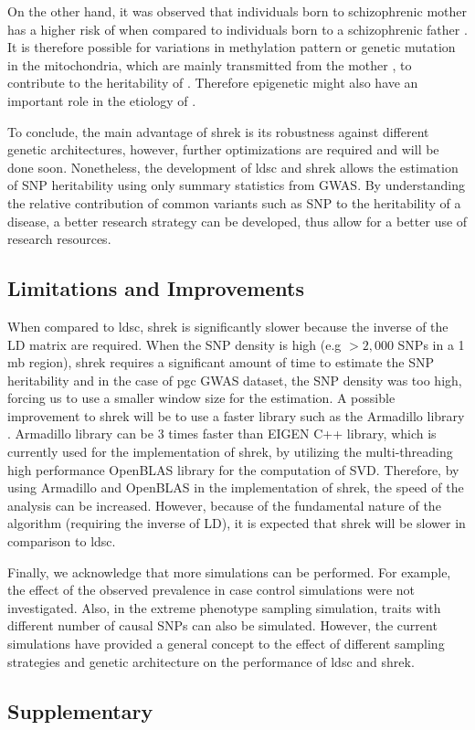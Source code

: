 	On the other hand, it was observed that individuals born to schizophrenic mother has a higher risk of  when compared to individuals born to a schizophrenic father \citep{Riley2006}. 
	It is therefore possible for variations in methylation pattern or genetic mutation in the mitochondria, which are mainly transmitted from the mother \citep{Sutovsky1999}, to contribute to the heritability of .
	Therefore epigenetic might also have an important role in the etiology of .

	To conclude, the main advantage of \gls{shrek} is its robustness against different genetic architectures, however, further optimizations are required and will be done soon. 
	Nonetheless, the development of \gls{ldsc} and \gls{shrek} allows the estimation of \gls{SNP} heritability using only summary statistics from \gls{GWAS}.
	By understanding the relative contribution of common variants such as \gls{SNP} to the heritability of a disease, a better research strategy can be developed, thus allow for a better use of research resources.
	
	\subsection{Limitations and Improvements}
	When compared to \gls{ldsc}, \gls{shrek} is significantly slower because the inverse of the \gls{LD} matrix are required.
	When the \gls{SNP} density is high (e.g $>2,000$ \glspl{SNP} in a 1 \gls{mb} region), \gls{shrek} requires a significant amount of time to estimate the \gls{SNP} heritability and in the case of \gls{pgc}  \gls{GWAS} dataset, the \gls{SNP} density was too high, forcing us to use a smaller window size for the estimation.
	A possible improvement to \gls{shrek} will be to use a faster library such as the Armadillo library \citep{Sanderson2010}.
	Armadillo library can be 3 times faster than EIGEN C++ library, which is currently used for the implementation of \gls{shrek}, by utilizing the multi-threading high performance OpenBLAS library for the computation of \gls{SVD}.
	Therefore, by using Armadillo and OpenBLAS in the implementation of \gls{shrek}, the speed of the analysis can be increased.
	However, because of the fundamental nature of the algorithm (requiring the inverse of \gls{LD}), it is expected that \gls{shrek} will be slower in comparison to \gls{ldsc}.
	
	Finally, we acknowledge that more simulations can be performed. 
	For example, the effect of the observed prevalence in case control simulations were not investigated. 
	Also, in the extreme phenotype sampling simulation, traits with different number of causal \glspl{SNP} can also be simulated.
	However, the current simulations have provided a general concept to the effect of different sampling strategies and genetic architecture on the performance of \gls{ldsc} and \gls{shrek}.
	
\begin{singlespace}
\section{Supplementary}



\end{singlespace}
	